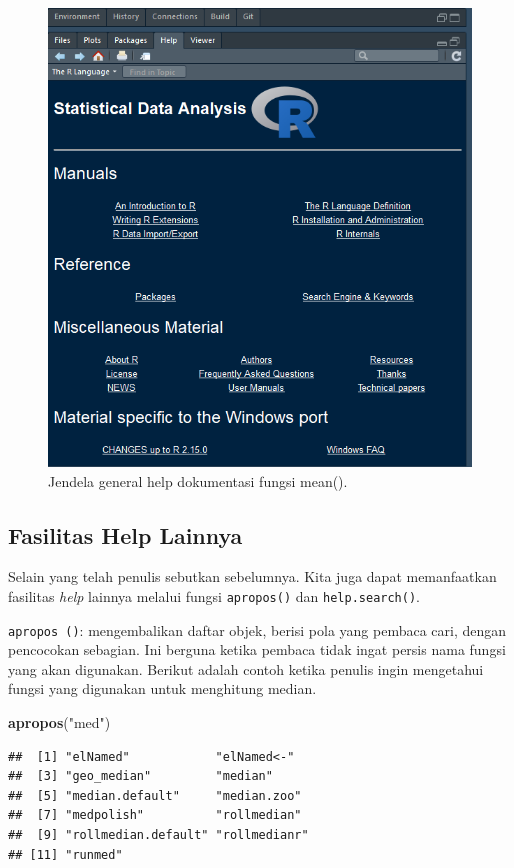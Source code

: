 \documentclass[]{book}
\newenvironment{Shaded}{\begin{snugshade}}{\end{snugshade}}
\newcommand{\KeywordTok}[1]{\textcolor[rgb]{0.13,0.29,0.53}{\textbf{#1}}}
\newcommand{\NormalTok}[1]{#1}
\newcommand{\StringTok}[1]{\textcolor[rgb]{0.31,0.60,0.02}{#1}}
\theoremstyle{definition}
\theoremstyle{definition}
\theoremstyle{definition}
\theoremstyle{remark}
\begin{document}
\begin{figure}

{\centering \includegraphics[width=0.5\linewidth]{./images/generalhelp} 

}

\caption{Jendela general help dokumentasi fungsi mean().}\label{fig:generalhelp}
\end{figure}

\hypertarget{othershelp}{%
\subsection{Fasilitas Help Lainnya}\label{othershelp}}

Selain yang telah penulis sebutkan sebelumnya. Kita juga dapat memanfaatkan fasilitas \emph{help} lainnya melalui fungsi \texttt{apropos()} dan \texttt{help.search()}.

\texttt{apropos\ ()}: mengembalikan daftar objek, berisi pola yang pembaca cari, dengan pencocokan sebagian. Ini berguna ketika pembaca tidak ingat persis nama fungsi yang akan digunakan. Berikut adalah contoh ketika penulis ingin mengetahui fungsi yang digunakan untuk menghitung median.

\begin{Shaded}
\begin{Highlighting}[]
\KeywordTok{apropos}\NormalTok{(}\StringTok{"med"}\NormalTok{)}
\end{Highlighting}
\end{Shaded}

\begin{verbatim}
##  [1] "elNamed"            "elNamed<-"         
##  [3] "geo_median"         "median"            
##  [5] "median.default"     "median.zoo"        
##  [7] "medpolish"          "rollmedian"        
##  [9] "rollmedian.default" "rollmedianr"       
## [11] "runmed"
\end{verbatim}
\end{document}

